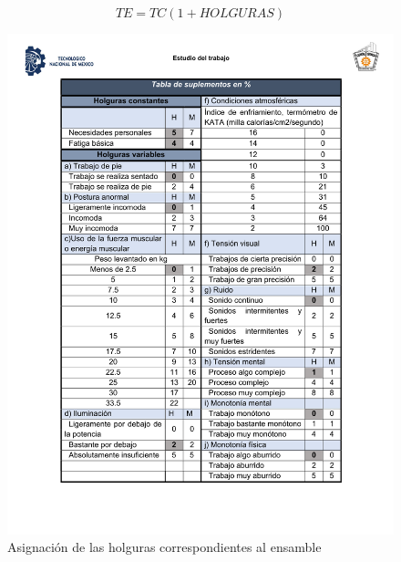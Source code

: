     
     \begin{equation}
            \label{equ:TE1}
           TE = TC(1+HOLGURAS)
        \end{equation}
    
    
    \begin{figure}[H]
        \centering
        \includegraphics[trim = {22mm 24mm 18mm 24mm},clip,scale=0.45]{22/Img/asignacionDeHolguras.pdf}
        \caption{Asignación de las holguras correspondientes al ensamble}
        \label{fig:AsignacionHolguras}
    \end{figure}
    
    
    
